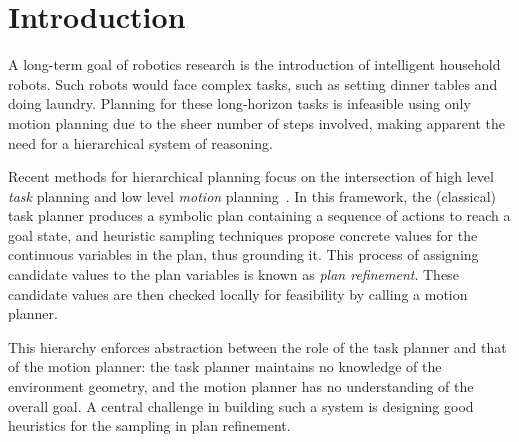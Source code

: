 \section{Introduction}
A long-term goal of robotics research is the introduction of intelligent household robots.
Such robots would face complex tasks, such as setting
dinner tables and doing laundry. Planning for these long-horizon tasks is infeasible
using only motion planning due to the sheer number of steps involved, making apparent the need
for a hierarchical system of reasoning.

Recent methods for hierarchical planning focus on the intersection of high level \emph{task} planning
and low level \emph{motion} planning~\cite{srivastava2014combined, kaelbling2011hierarchical,
lagriffoul2014orientation}. In this framework, the (classical) task planner produces
a symbolic plan containing a sequence of actions to reach a goal
state, and heuristic sampling techniques propose concrete values for
the continuous variables in the plan, thus grounding it. This process of assigning
candidate values to the plan variables is known as \emph{plan refinement}. These candidate values
are then checked locally for feasibility by calling a motion planner.

This hierarchy enforces abstraction between the role of the task planner and that of the motion planner:
the task planner maintains no knowledge of the environment geometry, and the
motion planner has no understanding of the overall goal.
A central challenge in building such a system is designing good heuristics for the sampling in plan refinement.

